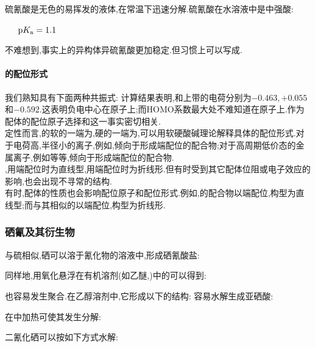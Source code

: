 \documentclass{ctexart}
\begin{document}
\indent 硫氰酸是无色的易挥发的液体,在常温下迅速分解.硫氰酸在水溶液中是中强酸:
\begin{center}
    \ \ \ $\text pK_{\text a}=1.1$
\end{center}
不难想到,事实上的异构体异硫氰酸更加稳定.但习惯上可以写成.
\paragraph{的配位形式}
我们熟知具有下面两种共振式:
计算结果表明,和上带的电荷分别为$-0.463,+0.055$和$-0.592$.这表明负电中心在原子上;而HOMO系数最大处不难知道在原子上.作为配体的配位原子选择和这一事实密切相关.\\
\indent 定性而言,的软的一端为,硬的一端为,可以用软硬酸碱理论解释具体的配位形式.对于电荷高,半径小的离子,例如,倾向于形成端配位的配合物;对于高周期低价态的金属离子,例如等等,倾向于形成端配位的配合物.\\
\indent {},用端配位时为直线型,用端配位时为折线形.但有时受到其它配体位阻或电子效应的影响,也会出现不寻常的结构.\\
\indent 有时,配体的性质也会影响配位原子和配位形式.例如,的配合物以端配位,构型为直线型;而与其相似的以端配位,构型为折线形.
\subsubsection{硒氰及其衍生物}
与硫相似,硒可以溶于氰化物的溶液中,形成硒氰酸盐:
\begin{center}
\end{center}
同样地,用氧化悬浮在有机溶剂(如乙醚,)中的可以得到:
\begin{center}
\end{center}
也容易发生聚合.在乙醇溶剂中,它形成以下的结构:
容易水解生成亚硒酸:
\begin{center}
\end{center}
在中加热可使其发生分解:
\begin{center}
\end{center}
二氰化硒可以按如下方式水解:
\begin{center}
\end{center}
\end{document}
